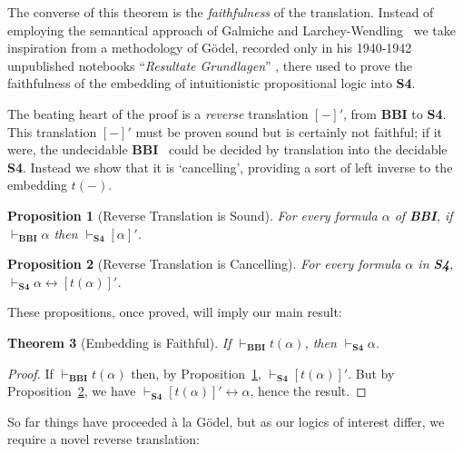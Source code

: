 \documentclass[a4paper]{article}
\newtheorem{theorem}{Theorem}[section]
\newtheorem{proposition}[theorem]{Proposition}
\newcommand{\BBI}{\textbf{BBI}\xspace}
\newcommand{\SFour}{\textbf{S4}\xspace}
\newcommand{\rev}[1]{[#1]'}
\begin{document}
The converse of this theorem is the \emph{faithfulness} of the translation.
Instead of employing the semantical approach of Galmiche and Larchey-Wendling~\cite{galmiche_expressivity_2006} we take inspiration from a methodology of G\"odel, recorded only in his 1940-1942 unpublished notebooks “\textit{Resultate Grundlagen}'' \cite{Godel_Grundlagen}, there used to prove the faithfulness of the embedding of intuitionistic propositional logic into \SFour.

The beating heart of the proof is a \emph{reverse} translation $\rev{-}$, from \BBI to \SFour.
This translation $\rev{-}$ must be proven sound but is certainly not faithful; if it were, the undecidable \BBI~\cite{5570897} could be decided by translation into the decidable \SFour. Instead we show that it is `cancelling', providing a sort of left inverse to the embedding $t(-)$.

\begin{proposition}[Reverse Translation is Sound]
\label{Prop:rev_sound}
For every formula $\alpha$ of \BBI, if $\vdash_{\BBI} \alpha$ then $\vdash_{\SFour} [\alpha]'$.
\end{proposition}

\begin{proposition}[Reverse Translation is Cancelling]
\label{Prop:cancel}
For every formula $\alpha$ in \SFour, $\vdash_{\SFour} \alpha \leftrightarrow \rev{t(\alpha)}$.
\end{proposition}

These propositions, once proved, will imply our main result:

\begin{theorem}[Embedding is Faithful] \label{Theor:Faithfulness}
 If $\vdash_{\BBI}t(\alpha)$, then $\vdash_{\SFour}\alpha$.
\end{theorem}
\begin{proof}If $\vdash_{\BBI}t(\alpha)$ then, by
Proposition~\ref{Prop:rev_sound}, $\vdash_{\SFour}\rev{t(\alpha)}$. But by Proposition~\ref{Prop:cancel}, we have $\vdash_{\SFour}\rev{t(\alpha)}\leftrightarrow\alpha$, hence the result.
\end{proof} 


So far things have proceeded \`a la G\"odel, but as our logics of interest differ, we require a novel reverse translation: 
\end{document}
